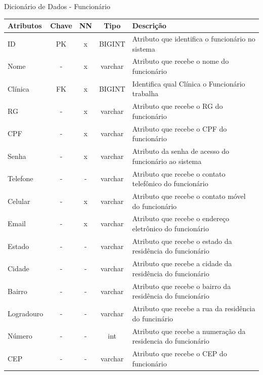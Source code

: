 \documentclass[
    12pt,               %
    openright,          %
    oneside,
    a4paper,            %
    BIBLATEX,           %
    TODO,               %
    english,            %
    brazil              %
    ]{ifsp-spo-inf-ctds}
\begin{document}
    \begin{center}
      \begin{quadro}[H]
      \centering
          \caption{Dicionário de Dados - Funcionário}
          \begin{tabulary}{1.0\textwidth}{|p{9em}|c|c|c|p{19em}|}
        \hline
        Atributos & Chave & NN & Tipo & Descrição\\
        \hline
        ID & PK & x & BIGINT & Atributo que identifica o funcionário no sistema \\
        \hline
        Nome & - & x & varchar & Atributo que recebe o nome do funcionário \\
        \hline
        Clínica & FK & x & BIGINT & Identifica qual Clínica o Funcionário trabalha\\
        \hline
        RG & - & x & varchar & Atributo que recebe o RG do funcionário\\
        \hline
        CPF & - & x & varchar & Atributo que recebe o CPF do funcionário\\
        \hline
        Senha & - & x & varchar & Atributo da senha de acesso do funcionário ao sistema\\
        \hline
        Telefone & - & - & varchar & Atributo que recebe o contato telefônico do funcionário\\
        \hline
        Celular & - & x & varchar & Atributo que recebe o contato móvel do funcionário \\
        \hline
        Email & - & x & varchar & Atributo que recebe o endereço eletrônico do funcionário\\
        \hline
        Estado & - & - & varchar & Atributo que recebe o estado da residência do funcionário\\
        \hline
        Cidade & - & - & varchar & Atributo que recebe a cidade da residência do funcionário\\
        \hline
        Bairro & - & - & varchar & Atributo que recebe o bairro da residência do funcionário\\
        \hline
        Logradouro & - & - & varchar & Atributo que recebe a rua da residência do funcinário \\
        \hline
        Número & - & - & int & Atributo que recebe a numeração da residencia do funcionário\\
        \hline
        CEP & - & - & varchar & Atributo que recebe o CEP do funcionário\\
        \hline
        \end{tabulary}
         
          \label{qd: md-funcionario}
      \end{quadro}
    \end{center}
    
\end{document}
